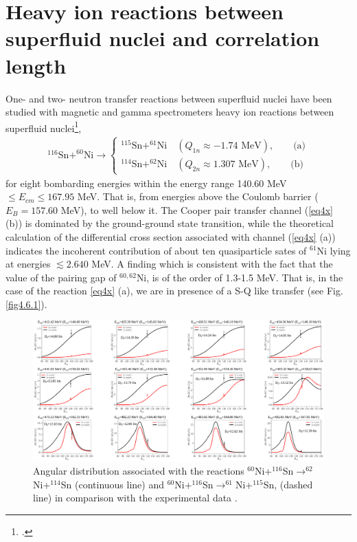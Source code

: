 \section{Heavy ion reactions between superfluid nuclei and correlation length}\label{S7.3}
One- and two- neutron transfer reactions between superfluid nuclei have been studied with magnetic and gamma spectrometers  heavy ion reactions between superfluid nuclei\footnote{\cite{Montanari:14,Montanari:16}.},
\begin{align}\label{eq4x}
^{116}\text{Sn}+^{60}\text{Ni}\to\left\{\begin{array}{c}
^{115}\text{Sn}+^{61}\text{Ni}\quad (Q_{1n}\approx -1.74\text{ MeV}),\quad\quad\text{(a)} \\ [10pt]
^{114}\text{Sn}+^{62}\text{Ni}\quad (Q_{2n}\approx 1.307\text{ MeV}),\quad\quad\text{(b)}
\end{array} \right.
\end{align}
for eight bombarding energies within the energy range 140.60 MeV$\leq E_{cm}\leq167.95$ MeV. That is, from energies above the Coulomb barrier ($E_B=157.60$ MeV), to well below it. The Cooper pair transfer channel (\ref{eq4x} (b)) is dominated by the ground-ground state transition, while the theoretical calculation of the differential cross section associated with channel (\ref{eq4x} (a)) indicates the incoherent contribution of about ten quasiparticle sates of $^{61}$Ni lying at energies $\lesssim 2.640$ MeV. A finding  which is consistent with the fact that the value of the pairing gap of $^{60,62}$Ni, is of the order of 1.3-1.5 MeV. That is, in the case of the reaction \ref{eq4x} (a), we are in presence of a  S-Q like transfer (see Fig. \ref{fig4.6.1}).	
    \begin{figure}
	\centerline{\includegraphics*[width=18cm,angle=0]{C8/figsC8/SnNi2n_v4}}
	\caption{Angular distribution associated with the reactions $^{60}$Ni+$^{116}$Sn$\to^{62}$Ni+$^{114}$Sn (continuous line) and $^{60}$Ni+$^{116}$Sn$\to^{61}$Ni+$^{115}$Sn, (dashed line) in comparison with the experimental  data \citep{Montanari:14}.}\label{fig7.3.1}
\end{figure}




